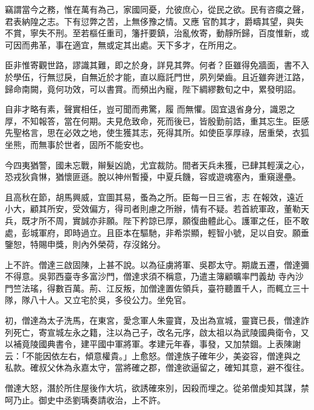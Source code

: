 \begin{pinyinscope}
 竊謂當今之務，惟在萬有為己，家國同憂，允彼庶心，從民之欲。民有咨瘼之聲，君表納隍之志。下有愆弊之苦，上無侈豫之情。又應
 官酌其才，爵疇其望，與失不賞，寧失不刑。至若樞任重司，籓扞要鎮，治亂攸寄，動靜所歸，百度惟新，或可因而弗革，事在適宜，無或定其出處。天下多才，在所用之。



 臣非惟寄觀世路，謬識其難，即之於身，詳見其弊。何者？臣雖得免牆面，書不入於學伍，行無愆戾，自無近於才能，直以廕託門世，夙列榮齒。且近雖奔迸江路，歸命南闕，竟何功效，可以書賞。而頻出內寵，陛下綢繆數旬之中，累發明詔。



 自非才略有素，聲實相任，豈可聞而弗驚，履
 而無懼。固宜退省身分，識恩之厚，不知報答，當在何期。夫見危致命，死而後已，皆殷勤前誥，重其忘生。臣感先聖格言，思在必效之地，使生獲其志，死得其所。如使臣享厚祿，居重榮，衣狐坐熊，而無事於世者，固所不能安也。



 今四夷猶警，國未忘戰，辮髮凶詭，尤宜裁防。間者天兵未獲，已肆其輕漢之心，恐戎狄貪惏，猶懷匪遜。脫以神州暫擾，中夏兵饑，容或遊魂塞內，重窺邊壘。



 且高秋在節，胡馬興威，宜圖其易，蚤為之所。臣每一日三省，志
 在報效，遠近小大，顧其所安，受效偏方，得司者則慮之所辦，情有不疑。若首統軍政，董勒天兵，既才所不周，實誠亦非願。陛下矜諒已厚，願復曲體此心。護軍之任，臣不敢處，彭城軍府，即時過立。且臣本在驅馳，非希崇顯，輕智小號，足以自安。願垂鑒恕，特賜申獎，則內外榮荷，存沒銘分。



 上不許。僧達三啟固陳，上甚不說。以為征虜將軍、吳郡太守。期歲五遷，僧達彌不得意。吳郭西臺寺多富沙門，僧達求須不稱意，乃遣主簿顧曠率門義劫
 寺內沙門竺法瑤，得數百萬。荊、江反叛，加僧達置佐領兵，臺符聽置千人，而輒立三十隊，隊八十人。又立宅於吳，多役公力。坐免官。



 初，僧達為太子洗馬，在東宮，愛念軍人朱靈寶，及出為宣城，靈寶已長，僧達詐列死亡，寄宣城左永之籍，注以為己子，改名元序，啟太祖以為武陵國典衛令，又以補竟陵國典書令，建平國中軍將軍。孝建元年春，事發，又加禁錮。上表陳謝云：「不能因依左右，傾意權貴。」上愈怒。僧達族子確年少，美姿容，僧達與之
 私款。確叔父休為永嘉太守，當將確之郡，僧達欲逼留之，確知其意，避不復往。



 僧達大怒，潛於所住屋後作大坑，欲誘確來別，因殺而埋之。從弟僧虔知其謀，禁呵乃止。御史中丞劉瑀奏請收治，上不許。




\end{pinyinscope}
